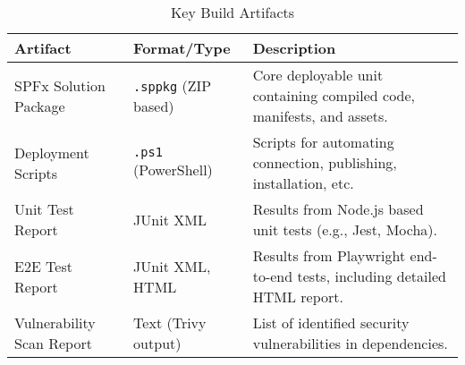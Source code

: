 \begin{table}[htbp]
    \centering
    \caption{Key Build Artifacts}
    \label{tab:KeyBuildArtifacts}
    \begin{tabular}{|l|l|p{7cm}|}
        \hline
        \textbf{Artifact} & \textbf{Format/Type} & \textbf{Description} \\
        \hline
        SPFx Solution Package & \texttt{.sppkg} (ZIP based) & Core deployable unit containing compiled code, manifests, and assets. \\
        \hline
        Deployment Scripts & \texttt{.ps1} (PowerShell) & Scripts for automating connection, publishing, installation, etc. \\
        \hline
        Unit Test Report & JUnit XML & Results from Node.js based unit tests (e.g., Jest, Mocha). \\
        \hline
        E2E Test Report & JUnit XML, HTML & Results from Playwright end-to-end tests, including detailed HTML report. \\
        \hline
        Vulnerability Scan Report & Text (Trivy output) & List of identified security vulnerabilities in dependencies. \\
        \hline
    \end{tabular}
\end{table}
